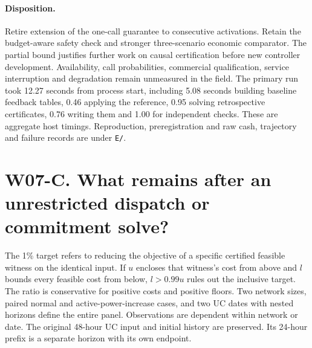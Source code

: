 \documentclass[11pt,letterpaper]{article}
\begin{document}
\paragraph{Disposition.}
Retire extension of the one-call guarantee to consecutive activations. Retain the budget-aware safety check and stronger three-scenario economic comparator. The partial bound justifies further work on causal certification before new controller development. Availability, call probabilities, commercial qualification, service interruption and degradation remain unmeasured in the field. The primary run took 12.27 seconds from process start, including 5.08 seconds building baseline feedback tables, 0.46 applying the reference, 0.95 solving retrospective certificates, 0.76 writing them and 1.00 for independent checks. These are aggregate host timings. Reproduction, preregistration and raw cash, trajectory and failure records are under \texttt{E/}.
\section{W07-C. What remains after an unrestricted dispatch or commitment solve?}
The 1\% target refers to reducing the objective of a specific certified feasible witness on the identical input. If $u$ encloses that witness's cost from above and $l$ bounds every feasible cost from below, $l>0.99u$ rules out the inclusive target. The ratio is conservative for positive costs and positive floors. Two network sizes, paired normal and active-power-increase cases, and two UC dates with nested horizons define the entire panel. Observations are dependent within network or date. The original 48-hour UC input and initial history are preserved. Its 24-hour prefix is a separate horizon with its own endpoint.
\end{document}
